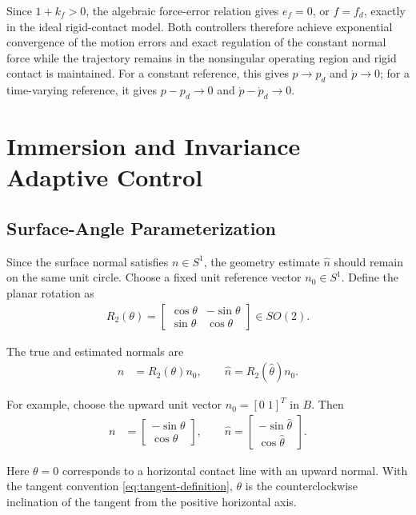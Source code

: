 \documentclass[10pt,journal,letterpaper]{IEEEtran}
\begin{document}
Since $1+k_f>0$, the algebraic force-error relation gives $e_f=0$, or $f=f_d$, exactly in the ideal rigid-contact model. Both controllers therefore achieve exponential convergence of the motion errors and exact regulation of the constant normal force while the trajectory remains in the nonsingular operating region and rigid contact is maintained. For a constant reference, this gives $p\to p_d$ and $\dot p\to0$; for a time-varying reference, it gives $p-p_d\to0$ and $\dot p-\dot p_d\to0$.

\section{Immersion and Invariance Adaptive Control}\label{sec:iac}
\subsection{Surface-Angle Parameterization}
Since the surface normal satisfies $n\in S^{1}$, the geometry estimate $\hat n$ should remain on the same unit circle. Choose a fixed unit reference vector $n_0\in S^{1}$. Define the planar rotation as
\begin{align*}
R_{2}(\theta)
=
\begin{bmatrix}
\cos\theta&-\sin\theta\\
\sin\theta&\cos\theta
\end{bmatrix}
\in SO(2).
\end{align*}

The true and estimated normals are
\begin{equation}\label{eq:normal-parameterization}
\begin{aligned}
n&=R_{2}(\theta)n_0, \qquad
\hat n=R_{2}(\hat\theta)n_0.
\end{aligned}
\end{equation}

For example, choose the upward unit vector $n_0=[0\;1]^T$ in $B$. Then
\begin{align*}
n&=\begin{bmatrix}-\sin\theta\\\cos\theta\end{bmatrix}, \qquad
\hat n=\begin{bmatrix}-\sin\hat\theta\\\cos\hat\theta\end{bmatrix}.
\end{align*}

Here $\theta=0$ corresponds to a horizontal contact line with an upward normal. With the tangent convention \eqref{eq:tangent-definition}, $\theta$ is the counterclockwise inclination of the tangent from the positive horizontal axis. 
\end{document}
